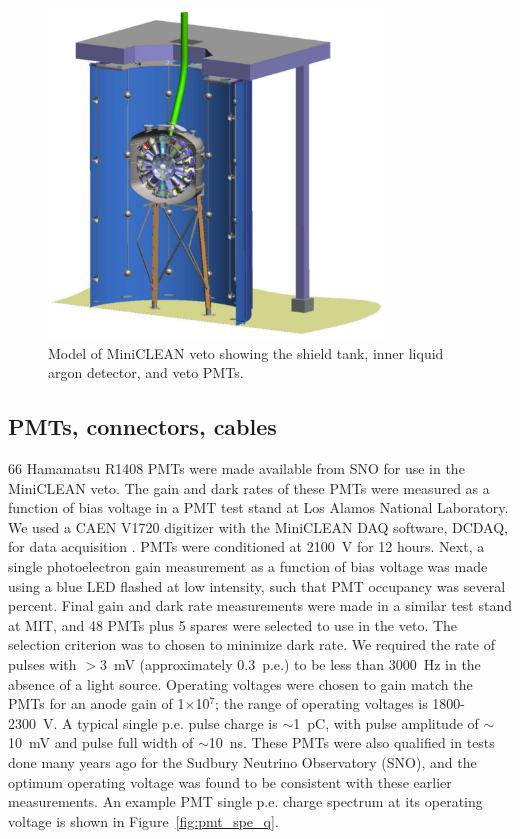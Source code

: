 \documentclass{JINST}
\begin{document}
\begin{figure}[ht]
\begin{center}
\includegraphics[width=3.5in]{graphics/miniclean_overview_drawing.pdf}
\caption{Model of MiniCLEAN veto showing the shield tank, inner liquid argon detector, and veto PMTs.
\label{fig:veto_geom}}
\end{center}
\end{figure}

\subsection{PMTs, connectors, cables}
\label{sec:pmts}
%
66 Hamamatsu R1408 PMTs were made available from SNO for use in the MiniCLEAN
veto. The gain and dark rates of these PMTs were measured as a
function of bias voltage in a PMT test stand at Los Alamos National
Laboratory. We used a CAEN V1720 digitizer with the MiniCLEAN DAQ
software, DCDAQ, for data acquisition \cite{ref:gastler_thesis}. PMTs were conditioned at 2100~V
for 12 hours. Next, a single photoelectron gain measurement as a
function of bias voltage was made using a blue LED flashed at low
intensity, such that PMT occupancy was several percent. Final gain and
dark rate measurements were made in a similar test stand at MIT, and
48 PMTs plus 5 spares were selected to use in the veto. The selection
criterion was to chosen to minimize dark rate. We required the rate of pulses with
$>$3~mV (approximately 0.3~p.e.) to be less than 3000~Hz in the
absence of a light source. Operating voltages were chosen to gain
match the PMTs for an anode gain of 1$\times$10$^7$; the range of
operating voltages is 1800-2300~V. A typical single p.e. pulse charge
is $\sim$1~pC, with pulse amplitude of $\sim$10~mV and pulse full width of
$\sim$10~ns. These PMTs were also qualified in tests done many years ago for
the Sudbury Neutrino Observatory (SNO), and the optimum operating voltage was
found to be consistent with these earlier measurements.
An example PMT single p.e. charge spectrum at its operating voltage is
shown in Figure~\ref{fig:pmt_spe_q}.
\end{document}
